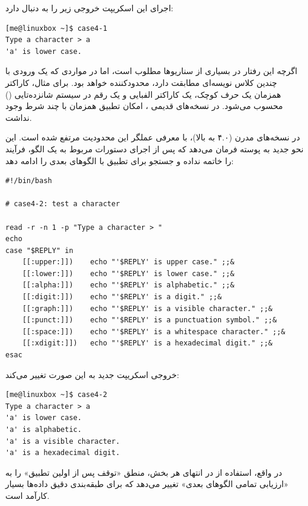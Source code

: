 اجرای این اسکریپت خروجی زیر را به دنبال دارد:

\begin{latin}
\begin{lstlisting}
[me@linuxbox ~]$ case4-1
Type a character > a
'a' is lower case.
\end{lstlisting}
\end{latin}

اگرچه این رفتار در بسیاری از سناریوها مطلوب است، اما در مواردی که یک ورودی با چندین کلاس نویسه‌ای  مطابقت دارد، محدودکننده خواهد بود. برای مثال، کاراکتر  همزمان یک حرف کوچک، یک کاراکتر الفبایی و یک رقم در سیستم شانزده‌تایی () محسوب می‌شود. در نسخه‌های قدیمی ، امکان تطبیق همزمان با چند شرط وجود نداشت.

در نسخه‌های مدرن  (۴.۰ به بالا)، با معرفی عملگر \cmd{;;\&} این محدودیت مرتفع شده است. این نحو جدید به پوسته فرمان می‌دهد که پس از اجرای دستورات مربوط به یک الگو، فرآیند را خاتمه نداده و جستجو برای تطبیق با الگوهای بعدی را ادامه دهد:

\begin{latin}
\begin{lstlisting}
#!/bin/bash

# case4-2: test a character

read -r -n 1 -p "Type a character > "
echo
case "$REPLY" in
    [[:upper:]])    echo "'$REPLY' is upper case." ;;&
    [[:lower:]])    echo "'$REPLY' is lower case." ;;&
    [[:alpha:]])    echo "'$REPLY' is alphabetic." ;;&
    [[:digit:]])    echo "'$REPLY' is a digit." ;;&
    [[:graph:]])    echo "'$REPLY' is a visible character." ;;&
    [[:punct:]])    echo "'$REPLY' is a punctuation symbol." ;;&
    [[:space:]])    echo "'$REPLY' is a whitespace character." ;;&
    [[:xdigit:]])   echo "'$REPLY' is a hexadecimal digit." ;;&
esac
\end{lstlisting}
\end{latin}

خروجی اسکریپت جدید به این صورت تغییر می‌کند:

\begin{latin}
\begin{lstlisting}
[me@linuxbox ~]$ case4-2
Type a character > a
'a' is lower case.
'a' is alphabetic.
'a' is a visible character.
'a' is a hexadecimal digit.
\end{lstlisting}
\end{latin}

در واقع، استفاده از \cmd{;;\&} در انتهای هر بخش، منطق «توقف پس از اولین تطبیق» را به «ارزیابی تمامی الگوهای بعدی» تغییر می‌دهد که برای طبقه‌بندی دقیق داده‌ها بسیار کارآمد است.

